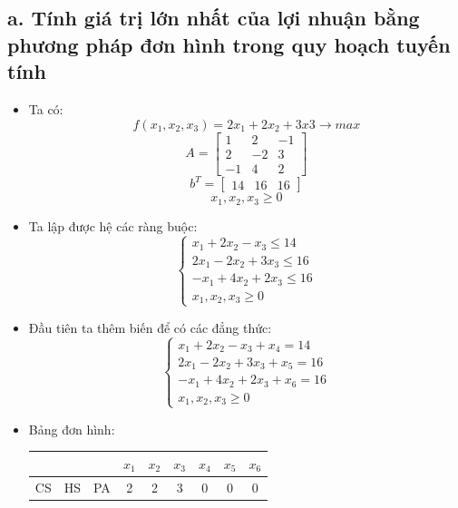 \documentclass[12pt,a4paper]{article}
\begin{document}
		\subsection*{a. Tính giá trị lớn nhất của lợi nhuận bằng phương pháp đơn hình trong quy hoạch tuyến tính}
			\begin{itemize}
				\item Ta có:
					\[f(x_1, x_2, x_3) = 2x_1 + 2x_2 + 3x3 \rightarrow max\]
					\[A = \begin{bmatrix}
						1 & 2 & -1\\
						2 & -2 & 3\\
						-1 & 4 & 2
					\end{bmatrix}\]
					\[b^T = \begin{bmatrix}
						14 & 16 & 16
					\end{bmatrix}\]
					\[x_1, x_2, x_3 \geq 0\]
				\item Ta lập được hệ các ràng buộc:
					\[\begin{cases}
						x_1 + 2x_2 - x_3 \leq 14\\
						2x_1 - 2x_2 + 3x_3 \leq 16\\
						-x_1 + 4x_2 + 2x_3 \leq 16\\
						x_1, x_2, x_3 \geq 0
					\end{cases}\]
				\item Đầu tiên ta thêm biến để có các đẳng thức:
					\[\begin{cases}
						x_1 + 2x_2 - x_3 + x_4 = 14\\
						2x_1 - 2x_2 + 3x_3 + x_5 = 16\\
						-x_1 + 4x_2 + 2x_3 + x_6 = 16\\
						x_1, x_2, x_3 \geq 0
					\end{cases}\]
				\item Bảng đơn hình:
					\begin{table}[H]
						\centering
						\setlength{\tabcolsep}{1.2em}
						{\renewcommand{\arraystretch}{1.5}\begin{tabular}{|ccc|c|c|c|c|c|c|}
						\hline
						\multicolumn{3}{|c|}{}                                                                                                          & \cellcolor[HTML]{B4C6E7}$x_1$ & \cellcolor[HTML]{B4C6E7}$x_2$ & \cellcolor[HTML]{B4C6E7}$x_3$ & \cellcolor[HTML]{B4C6E7}$x_4$ & \cellcolor[HTML]{B4C6E7}$x_5$ & \cellcolor[HTML]{B4C6E7}$x_6$ \\ \hline
						\multicolumn{1}{|c|}{\cellcolor[HTML]{B4C6E7}CS} & \multicolumn{1}{c|}{\cellcolor[HTML]{B4C6E7}HS} & \cellcolor[HTML]{B4C6E7}PA & 2                             & 2                             & 3                             & 0                             & 0                             & 0                             \\ \hline

\end{tabular}}
\end{table}
\end{itemize}
\end{document}
